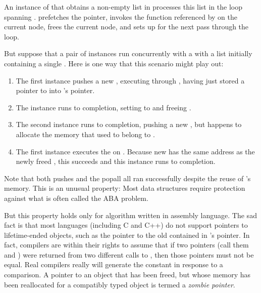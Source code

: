 \begin{fcvref}
An instance of  that obtains a non-empty list in
 processes this list in the loop spanning
.
 prefetches the  pointer,
 invokes the function referenced by  on the
current node,
 frees the current node, and
 sets up  for the next pass through the loop.

But suppose that a pair of  instances run concurrently
with a  with a list initially containing a single
.
Here is one way that this scenario might play out:

\begin{enumerate}
\item	The first  instance pushes a new ,
	executing through , having just stored
	a pointer to  into 's  pointer.
\item	The  instance runs to completion,
	setting  to  and freeing .
\item	The second  instance runs to completion,
	pushing a new , but happens to allocate the memory
	that used to belong to .
\item	The first  instance executes the 
	on .
	Because new  has the same address as the newly freed ,
	this  succeeds and this  instance
	runs to completion.
\end{enumerate}

Note that both pushes and the popall all ran successfully despite the
reuse of 's memory.
This is an unusual property:
Most data structures require protection against what is often called
the ABA problem.

But this property holds only for algorithm written in assembly
language.
The sad fact is that most languages (including C and C++) do not support
pointers to lifetime-ended objects, such as the pointer to the old 
contained in 's  pointer.
In fact, compilers are within their rights to assume that if two pointers
(call them  and ) were returned from two different calls to
, then those pointers must not be equal.
Real compilers really will generate the constant  in
response to a  comparison.
A pointer to an object that has been freed, but whose memory has been
reallocated for a compatibly typed object is termed a \emph{zombie pointer}.


\end{fcvref}
